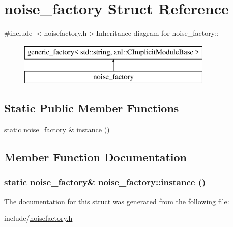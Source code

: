 \hypertarget{structnoise__factory}{
\section{noise\_\-factory Struct Reference}
\label{structnoise__factory}
}


{\ttfamily \#include $<$noisefactory.h$>$}Inheritance diagram for noise\_\-factory::\begin{figure}[H]
\begin{center}
\leavevmode
\includegraphics[height=2cm]{structnoise__factory}
\end{center}
\end{figure}
\subsection*{Static Public Member Functions}
\begin{DoxyCompactItemize}
\item 
static \hyperlink{structnoise__factory}{noise\_\-factory} \& \hyperlink{structnoise__factory_a936a1a3507f17bb99ea9a7bbaa5360aa}{instance} ()
\end{DoxyCompactItemize}


\subsection{Member Function Documentation}
\hypertarget{structnoise__factory_a936a1a3507f17bb99ea9a7bbaa5360aa}{
\subsubsection[{instance}]{\setlength{\rightskip}{0pt plus 5cm}static {\bf noise\_\-factory}\& noise\_\-factory::instance ()}}
\label{structnoise__factory_a936a1a3507f17bb99ea9a7bbaa5360aa}


The documentation for this struct was generated from the following file:\begin{DoxyCompactItemize}
\item 
include/\hyperlink{noisefactory_8h}{noisefactory.h}\end{DoxyCompactItemize}
